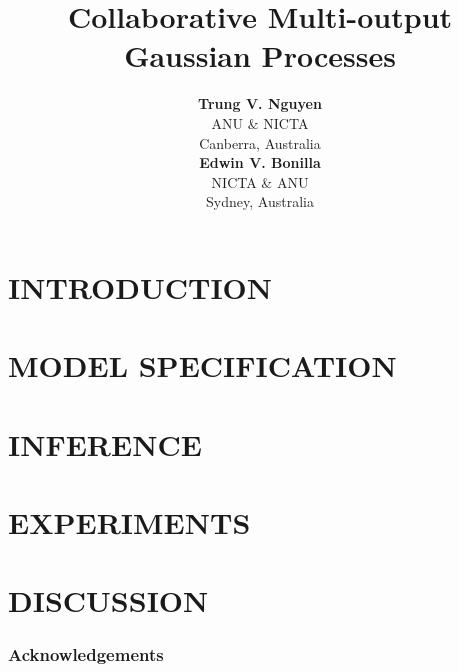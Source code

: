 \documentclass[]{article}
\title{Collaborative Multi-output Gaussian Processes}
\author{} %
\author{ {\bf Trung V. Nguyen} \\
ANU \& NICTA \\
Canberra, Australia\\
\And
{\bf Edwin V. Bonilla}  \\
NICTA \& ANU          \\
Sydney, Australia \\
}
\begin{document}
\maketitle

\begin{abstract}

\end{abstract}

\section{INTRODUCTION}


\section{MODEL SPECIFICATION \label{sec:model}}


\section{INFERENCE \label{sec:inference}}


\section{EXPERIMENTS \label{sec:experiments}}


\section{DISCUSSION \label{sec:discussion}}


\subsubsection*{Acknowledgements}




\end{document}
